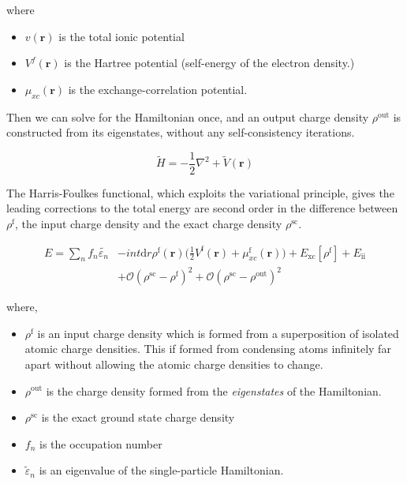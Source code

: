 \documentclass[11pt]{article}
\begin{document}
\begin{enumerate}
\begin{enumerate}
where 
\begin{itemize}
\item $v(\mathbf{r})$ is the total ionic potential
\item $V^{f}(\mathbf{r})$ is the Hartree potential (self-energy of the electron density.)
\item $\mu_{xc}(\mathbf{r})$ is the exchange-correlation potential.
\end{itemize}

Then we can solve for the Hamiltonian once, and an output charge density $\rho^{\text{out}}$ is
constructed from its eigenstates, without any self-consistency iterations.  

\[
\widetilde{H} = -\frac{1}{2} \nabla^{2} + \widetilde{V}(\mathbf{r})
\]



The Harris-Foulkes functional, which exploits the variational principle, gives 
the leading corrections to the total energy are second order in the difference 
between $\rho^{\text{f}}$, the input charge density and the exact charge density $\rho^{\text{sc}}$. 

\begin{align}
E = \sum_{n} f_{n} \tilde{\varepsilon_{n}} &- int \text{d}r \rho^{\text{f}}(\mathbf{r})
               \big( \frac{1}{2} V^{\text{f}}(\mathbf{r}) + \mu_{xc}^{\text{f}}(\mathbf{r})  \big)
               + E_{\text{xc}}[\rho^{\text{f}}] + E_{\text{ii}}\\
               &+ \mathcal{O}(\rho^{\text{sc}} - \rho^{\text{f}})^2 + \mathcal{O}(\rho^{\text{sc}} - \rho^{\text{out}})^2
\end{align}

where,
\begin{itemize}
\item $\rho^{\text{f}}$ is an input charge density which is formed
from a superposition of isolated atomic charge densities. This if formed
from condensing atoms infinitely far apart without allowing the atomic
charge densities to change.

\item $\rho^{\text{out}}$ is the charge
density formed from the \emph{eigenstates} of the Hamiltonian.

\item $\rho^{\text{sc}}$ is the exact ground state charge density

\item $f_{n}$ is the occupation number

\item $\tilde{\varepsilon}_{n}$ is an eigenvalue of the single-particle
Hamiltonian.


\end{itemize}
\end{enumerate}
\end{enumerate}
\end{document}
